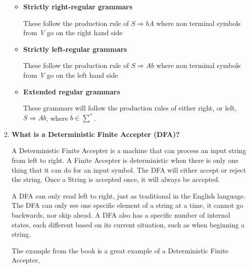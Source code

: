 \documentclass{article}
\begin{document}
\begin{enumerate}
    \begin{itemize}
        \item \textbf{Strictly right-regular grammars}
    
        \medskip
        
        \-\hspace{0.5cm} These follow the production rule of $S \Rightarrow bA$ where 
        non terminal symbols from \textit{V} go on the right hand side 
        \item \textbf{Strictly left-regular grammars}
        
        \medskip

        \-\hspace{0.5cm} These follow the production rule of $S \Rightarrow Ab$ where 
        non terminal symbols from \textit{V} go on the left hand side 
        \item \textbf{Extended regular grammars}
        
        \medskip

        \-\hspace{0.5cm} These grammars will follow the production rules of either right, or left,
        $S \Rightarrow Ab $, where $b \in \sum^*$.
    \end{itemize}

    \medskip

    \item \textbf{What is a Deterministic Finite Accepter (DFA)?}
    
    \medskip

    \-\hspace{0.5cm} A Deterministic Finite Accepter is a machine that can process an input
    string from left to right. A Finite Accepter is deterministic when there is only one thing
    that it can do for an input symbol. The DFA will either accept or reject the string. Once
    a String is accepted once, it will always be accepted. 

    \-\hspace{0.5cm} A DFA can only read left to right, just as traditional in the English
    language. The DFA can only see one specific element of a string at a time, it cannot go 
    backwards, nor skip ahead. A DFA also has a specific number of internal states, each
    different based on its current situation, such as when beginning a string. 

    \-\hspace{0.5cm} The example from the book is a great example of a Deterministic Finite Accepter,
    

\end{enumerate}
\end{document}
